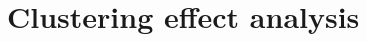 \documentclass[12pt]{article}
\newcommand{\bnote}[1]{\textcolor{purple}{\textbf{[B: #1]}}}
\newcommand{\unc}{u}
\newcommand{\eps}{\varepsilon^K}
\newcommand{\argmin}{\mathop{\rm argmin}}
\begin{document}



\section{Clustering effect analysis}
\label{sec:general_intro}
\end{document}
